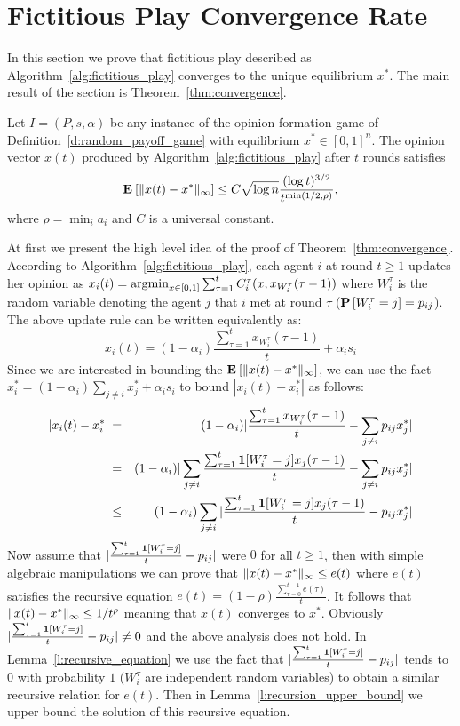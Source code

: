 \section{Fictitious Play Convergence Rate}\label{s:fictitious_convergence}
In this section we prove that fictitious play described as
Algorithm~\ref{alg:fictitious_play} converges to the unique equilibrium $x^*$.
The main result of the section is Theorem~\ref{thm:convergence}.

\begin{theorem}\label{thm:convergence}
  Let $I = (P,s, \alpha)$ be any instance of the opinion formation
  game of Definition~\ref{d:random_payoff_game} with equilibrium
  $x^* \in [0,1]^n$.  The opinion vector $x(t)$ produced by
  Algorithm~\ref{alg:fictitious_play} after $t$ rounds satisfies
  \[
    \bm{\mathrm{E}}_{} \left[ \| x(t) - x^* \|_{\infty} \right] \leq
    C \sqrt{\log n}\frac{(\log t)^{3/2}}{t^{\min(1/2,\rho)}},
  \]
  where $\rho = \min_i a_i$ and $C$ is a universal constant.
\end{theorem}
\noindent At first we present the high level idea of the proof of Theorem~\ref{thm:convergence}.
According to Algorithm~\ref{alg:fictitious_play}, each agent $i$ at round $t\geq 1$ updates her opinion 
as $x_i(t)=\operatorname*{argmin}_{x \in [0,1]}\sum_{\tau=1}^tC^{\tau}_i(x,x_{W_i^{\tau}}(\tau-1))$
where $W_i^\tau$ is the random variable denoting the agent $j$ that $i$ met at round $\tau$ ($\bm{\mathrm{P}}\left[W_i^\tau=j\right]=p_{ij}$). 
The above update rule can be written equivalently as: \[x_i(t)=(1-\alpha_i)\frac{\sum_{\tau=1}^{t} x_{W_i^\tau}(\tau-1)}{t}+ \alpha_i s_i\]
Since we are interested in bounding the $\bm{\mathrm{E}}_{} \left[ \| x(t)-x^* \|_{\infty} \right]$, we 
can use the fact $x_i^*= (1-\alpha_i)\sum_{j \neq i}x_j^* + \alpha_is_i$ to bound $|x_i(t)-x_i^*|$ as follows: 
\begin{eqnarray*}
 |x_i(t)-x_i^*| &=& (1-\alpha_i)|\frac{\sum_{\tau=1}^{t} x_{W_i^\tau}(\tau-1)}{t}-\sum_{j\neq i} p_{ij}x_j^*|\\
 &=& (1-\alpha_i)|\sum_{j\neq i}\frac{\sum_{\tau=1}^{t} \bm{1}{\left[W_i^\tau=j\right]}x_j(\tau-1)}{t}-\sum_{j\neq i} p_{ij}x_j^*|\\
 &\leq& (1-\alpha_i)\sum_{j\neq i}|\frac{\sum_{\tau=1}^{t} \bm{1}{\left[W_i^\tau=j\right]}x_j(\tau-1)}{t}- p_{ij}x_j^*|
\end{eqnarray*}
Now assume that $|\frac{\sum_{\tau=1}^{t} \bm{1}{\left[W_i^{\tau}=j\right]}}{t}- p_{ij}|$ were $0$ for all $t\geq 1$, 
then with simple algebraic manipulations we can prove that $\| x(t)-x^* \|_{\infty} \leq e(t)$
where $e(t)$ satisfies the recursive equation $e(t) = (1-\rho)\frac{\sum_{\tau=0}^{t-1}e(\tau)}{t}$.
It follows that $\| x(t)-x^* \|_{\infty} \leq 1/t^\rho$ meaning that $x(t)$ converges to $x^*$.
Obviously $|\frac{\sum_{\tau=1}^{t} \bm{1}{\left[W_i^{\tau}=j\right]}}{t} - p_{ij}|\neq 0$ and 
the above analysis does not hold. In Lemma~\ref{l:recursive_equation} we use the 
fact that $|\frac{\sum_{\tau=1}^{t} \bm{1}{\left[W_i^{\tau}=j\right]}}{t} - p_{ij}|$ tends to $0$ with probability $1$
($W_i^{\tau}$ are independent random variables)
to obtain a similar recursive relation for $e(t)$. Then in Lemma~\ref{l:recursion_upper_bound} 
we upper bound the solution of this recursive equation.

